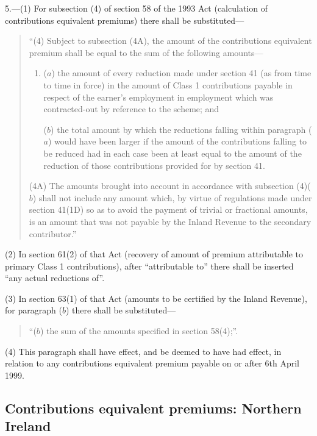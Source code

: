 \documentclass[12pt,a4paper]{article}
\begin{document}
5.---(1) For subsection (4)  of section 58 of the 1993 Act (calculation of contributions equivalent premiums) there shall be substituted—
\begin{quotation}
“(4) Subject to subsection (4A), the amount of the contributions equivalent premium shall be equal to the sum of the following amounts—
\begin{enumerate}\item[]
($a$) the amount of every reduction made under section 41 (as from time to time in force) in the amount of Class 1 contributions payable in respect of the earner’s employment in employment which was contracted-out by reference to the scheme; and

($b$) the total amount by which the reductions falling within paragraph ($a$)  would have been larger if the amount of the contributions falling to be reduced had in each case been at least equal to the amount of the reduction of those contributions provided for by section 41. 
\end{enumerate}

(4A) The amounts brought into account in accordance with subsection (4)($b$)  shall not include any amount which, by virtue of regulations made under section 41(1D) so as to avoid the payment of trivial or fractional amounts, is an amount that was not payable by the Inland Revenue to the secondary contributor.”
\end{quotation}

(2) In section 61(2)  of that Act (recovery of amount of premium attributable to primary Class 1 contributions), after “attributable to” there shall be inserted “any actual reductions of”.

(3) In section 63(1)  of that Act (amounts to be certified by the Inland Revenue), for paragraph ($b$)  there shall be substituted—
\begin{quotation}
“($b$) the sum of the amounts specified in section 58(4);”.
\end{quotation}

(4) This paragraph shall have effect, and be deemed to have had effect, in relation to any contributions equivalent premium payable on or after 6th April 1999. 

\subsection*{Contributions equivalent premiums: Northern Ireland}
\end{document}
